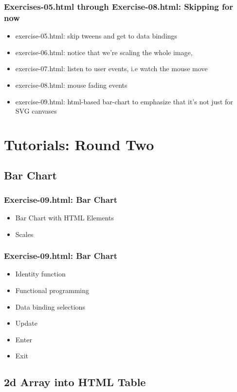 \documentclass{beamer}
\begin{document}
\begin{frame}
    \frametitle{Exercises-05.html through Exercise-08.html: Skipping for now}
    \begin{itemize}
    \item exercise-05.html: skip tweens and get to data bindings
    \item exercise-06.html: notice that we're scaling the whole image,
    \item exercise-07.html: listen to user events, i.e watch the mouse move
    \item exercise-08.html: mouse fading events
    \item exercise-09.html: html-based bar-chart to emphasize that it's not just for SVG canvases
    \end{itemize}
\end{frame}



\section{Tutorials: Round Two}

\subsection{Bar Chart}

\begin{frame}
    \frametitle{Exercise-09.html: Bar Chart}
    \begin{itemize}
    \item Bar Chart with HTML Elements
    \item Scales
    \end{itemize}
\end{frame}

\begin{frame}
    \frametitle{Exercise-09.html: Bar Chart}
    \begin{itemize}
    \item Identity function
    \item Functional programming
    \item Data binding selections
    \item Update
    \item Enter
    \item Exit
    \end{itemize}
\end{frame}



\subsection{2d Array into HTML Table}
\end{document}
